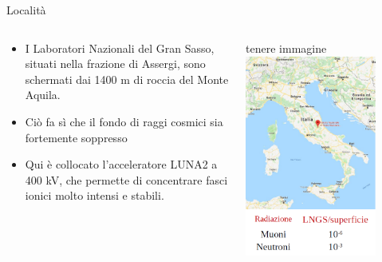 \documentclass [xcolor=svgnames] {beamer}
\begin{document}
	\begin{frame}{Località}
			\begin{columns}
					\begin{column}{0.5\textwidth}
							\begin{itemize}
									\item<1-> I Laboratori Nazionali del Gran Sasso, situati nella frazione di Assergi, sono schermati dai 1400 m di roccia del Monte Aquila.
									\item<2-> Ciò fa sì che il fondo di raggi cosmici sia fortemente soppresso
									\item<3-> Qui è collocato l'acceleratore LUNA2 a 400 kV, che permette di concentrare fasci ionici molto intensi e stabili.
								\end{itemize}
						\end{column}
					\begin{column}{0.5\textwidth}
			tenere immagine
							\centering
							\includegraphics[width=0.8\textwidth]{img/location.png}
						\end{column}
				\end{columns}
		\end{frame}
\end{document}

